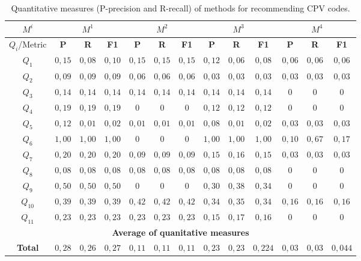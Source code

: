 \begin{table}[!htb]
\renewcommand{\arraystretch}{1.3}
\begin{center}
\scriptsize
\begin{tabular}{|c||c|c|c||c|c|c||c|c|c||c|c|c|}
\hline
 \textbf{$M^i$}&\multicolumn{3}{|c||}{$M^{1}$} & \multicolumn{3}{|c||}{$M^{2}$}& \multicolumn{3}{|c||}{$M^{3}$} & \multicolumn{3}{|c|}{$M^{4}$} \\ \hline
\textbf{$Q_i$}/Metric	  &\textbf{P} & \textbf{R} & \textbf{F1} & \textbf{P} & \textbf{R} & \textbf{F1} & \textbf{P} & \textbf{R} & \textbf{F1} & \textbf{P} & \textbf{R} & \textbf{F1}  \\ \hline \hline
$Q_1$  	  &$0,15$ & $0,08$ & $0,10$ &		$0,15$ & $0,15$ & $0,15$ &	$0,12$ & $0,06$ & $0,08$ &	$0,06$ & $0,06$ & $0,06$ \\ \hline
$Q_2$  	  &$0,09$ & $0,09$ & $0,09$ & 		$0,06$ & $0,06$ & $0,06$ & 	$0,03$ & $0,03$ & $0,03$ & 	$0,03$ & $0,03$ & $0,03$ \\ \hline
$Q_3$  	  &$0,14$ & $0,14$ & $0,14$ & 		$0,14$ & $0,14$ & $0,14$ & 	$0,14$ & $0,14$ & $0,14$ & 	$0$ & $0$ & $0$ \\ \hline
$Q_4$  	  &$0,19$ & $0,19$ & $0,19$ &		$0$ 	& $0$ & $0$ & 		$0,12$ & $0,12$ & $0,12$ & 	$0$ & $0$ & $0$ \\ \hline
$Q_5$  	  &$0,12$ & $0,01$ & $0,02$ & 		$0,01$ & $0,01$ & $0,01$ & 	$0,08$ & $0,01$ & $0,02$ & 	$0,03$ & $0,03$ & $0,03$ \\ \hline
$Q_6$  	  &$1,00$ & $1,00$ & $1,00$ & 		$0$ & $0$ & $0$ & 		$1,00$ & $1,00$ & $1,00$ & 	$0,10$ & $0,67$ & $0,17$ \\ \hline
$Q_7$  	  &$0,20$ & $0,20$ & $0,20$ & 		$0,09$ & $0,09$ & $0,09$ & 	$0,15$ & $0,16$ & $0,15$ & 	$0,03$ & $0,03$ & $0,03$ \\ \hline
$Q_8$  	  &$0,08$ & $0,08$ & $0,08$ & 		$0,08$ & $0,08$ & $0,08$ & 	$0,08$ & $0,08$ & $0,08$ & 	$0$ & $0$ & $0$ \\ \hline
$Q_9$  	  &$0,50$ & $0,50$ & $0,50$ & 		$0$ & $0$ & $0$ & 		$0,30$ & $0,38$ & $0,34$ & 	$0$ & $0$ & $0$ \\ \hline
$Q_{10}$  &$0,39$ & $0,39$ & $0,39$ & 		$0,42$ & $0,42$ & $0,42$ & 	$0,34$ & $0,35$ & $0,34$ & 	$0,16$ & $0,16$ & $0,16$ \\ \hline
$Q_{11}$  &$0,23$ & $0,23$ & $0,23$ & 		$0,23$ & $0,23$ & $0,23$ & 	$0,15$ & $0,17$ & $0,16$ & 	$0$ & $0$ & $0$ \\ \hline
\multicolumn{13}{|c|}{\textbf{Average of quanitative measures}} \\ \hline
\textbf{Total}  &$0,28$ & $0,26$ & $0,27$ & 	$0,11$ & $0,11$ & $0,11$ &  	$0,23$ & $0,23$ & $0,224$ &  	$0,03$ & $0,03$ & $0,044$ \\ \hline
\hline
 \end{tabular}
\caption{Quantitative measures (P-precision and R-recall) of methods for recommending CPV codes.}\label{table:queries-ir-results}
  \end{center}
\end{table} 


